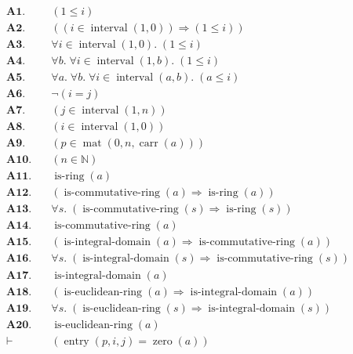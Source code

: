 \documentclass[11pt]{article}
\theoremstyle{plain}
\begin{document}
\begin{align*}
  \mathbf{A1.}\quad & (1 \leq i) \\
  \mathbf{A2.}\quad & ((i \in \operatorname{interval}(1, 0)) \Rightarrow (1 \leq i)) \\
  \mathbf{A3.}\quad & \forall i \in \operatorname{interval}(1, 0).\; (1 \leq i) \\
  \mathbf{A4.}\quad & \forall b.\; \forall i \in \operatorname{interval}(1, b).\; (1 \leq i) \\
  \mathbf{A5.}\quad & \forall a.\; \forall b.\; \forall i \in \operatorname{interval}(a, b).\; (a \leq i) \\
  \mathbf{A6.}\quad & \neg (i = j) \\
  \mathbf{A7.}\quad & (j \in \operatorname{interval}(1, n)) \\
  \mathbf{A8.}\quad & (i \in \operatorname{interval}(1, 0)) \\
  \mathbf{A9.}\quad & (p \in \operatorname{mat}(0, n, \operatorname{carr}(a))) \\
  \mathbf{A10.}\quad & (n \in \mathbb{N}) \\
  \mathbf{A11.}\quad & \operatorname{is\text{-}ring}(a) \\
  \mathbf{A12.}\quad & (\operatorname{is\text{-}commutative\text{-}ring}(a) \Rightarrow \operatorname{is\text{-}ring}(a)) \\
  \mathbf{A13.}\quad & \forall s.\; (\operatorname{is\text{-}commutative\text{-}ring}(s) \Rightarrow \operatorname{is\text{-}ring}(s)) \\
  \mathbf{A14.}\quad & \operatorname{is\text{-}commutative\text{-}ring}(a) \\
  \mathbf{A15.}\quad & (\operatorname{is\text{-}integral\text{-}domain}(a) \Rightarrow \operatorname{is\text{-}commutative\text{-}ring}(a)) \\
  \mathbf{A16.}\quad & \forall s.\; (\operatorname{is\text{-}integral\text{-}domain}(s) \Rightarrow \operatorname{is\text{-}commutative\text{-}ring}(s)) \\
  \mathbf{A17.}\quad & \operatorname{is\text{-}integral\text{-}domain}(a) \\
  \mathbf{A18.}\quad & (\operatorname{is\text{-}euclidean\text{-}ring}(a) \Rightarrow \operatorname{is\text{-}integral\text{-}domain}(a)) \\
  \mathbf{A19.}\quad & \forall s.\; (\operatorname{is\text{-}euclidean\text{-}ring}(s) \Rightarrow \operatorname{is\text{-}integral\text{-}domain}(s)) \\
  \mathbf{A20.}\quad & \operatorname{is\text{-}euclidean\text{-}ring}(a) \\
  \vdash\quad & (\operatorname{entry}(p, i, j) = \operatorname{zero}(a))
\end{align*}
\end{document}
